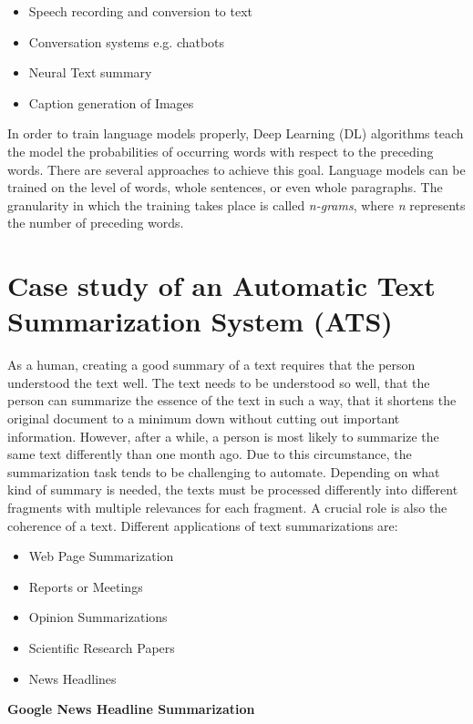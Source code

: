 \begin{itemize}
\item Speech recording and conversion to text
\item Conversation systems e.g. chatbots
\item Neural Text summary
\item Caption generation of Images
\end{itemize} 

In order to train language models properly, Deep Learning (DL) algorithms teach the model the probabilities of occurring words with respect to the preceding words. There are several approaches to achieve this goal. Language models can be trained on the level of words, whole sentences, or even whole paragraphs. The granularity in which the training takes place is called \textit{n-grams}, where \textit{n} represents the number of preceding words. 


\section{Case study of an Automatic Text Summarization System (ATS)}\label{ss:case}

As a human, creating a good summary of a text requires that the person understood the text well. The text needs to be understood so well, that the person can summarize the essence of the text in such a way, that it shortens the original document to a minimum down without cutting out important information. However, after a while, a person is most likely to summarize the same text differently than one month ago. Due to this circumstance, the summarization task tends to be challenging to automate. Depending on what kind of summary is needed, the texts must be processed differently into different fragments with multiple relevances for each fragment. A crucial role is also the coherence of a text. Different applications of text summarizations are:

\begin{itemize}
	\item Web Page Summarization
	\item Reports or Meetings
	\item Opinion Summarizations
	\item Scientific Research Papers
	\item News Headlines
\end{itemize}


\textbf{Google News Headline Summarization}

